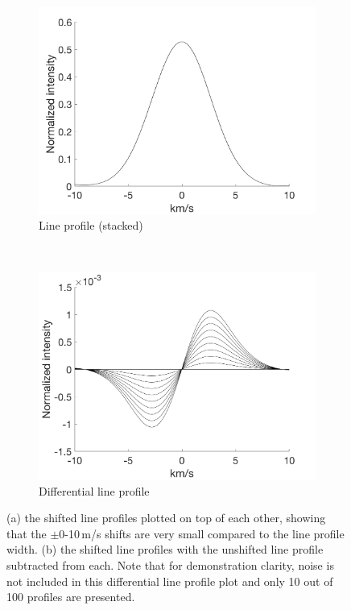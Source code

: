 \begin{figure}[tbp]
    \begin{subfigure}[b]{0.49\textwidth}
        \includegraphics[width=\textwidth]{./Figures/Methods/1-Line_Profile.png}
        \caption{Line profile (stacked)}
        \label{fig:line_profiles}
    \end{subfigure}
	~
    \begin{subfigure}[b]{0.49\textwidth}
        \includegraphics[width=\textwidth]{./Figures/Methods/1-Differential_line_Profile.png}
        \caption{Differential line profile}
        \label{fig:differential_line_profiles}
    \end{subfigure}	
    
    \caption[100 shifted HARPS-like line profiles]{(a) the shifted line profiles plotted on top of each other, showing that the $\pm$0-10\,m/s shifts are very small compared to the line profile width. (b) the shifted line profiles with the unshifted line profile subtracted from each. Note that for demonstration clarity, noise is not included in this differential line profile plot and only 10 out of 100 profiles are presented.}
\label{fig:line_profiles12}
\end{figure}	

